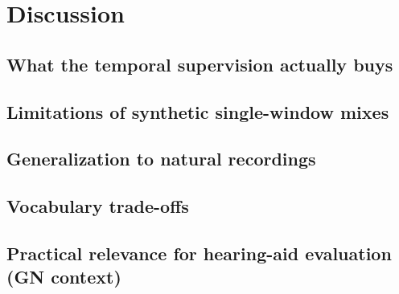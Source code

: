 \chapter{Discussion} \label{ch:discussion}

\section{What the temporal supervision actually buys} \label{sec:disc-value}

\section{Limitations of synthetic single-window mixes} \label{sec:disc-limitations}

\section{Generalization to natural recordings} \label{sec:disc-generalization}

\section{Vocabulary trade-offs} \label{sec:disc-vocab}

\section{Practical relevance for hearing-aid evaluation (GN context)} \label{sec:disc-product}
